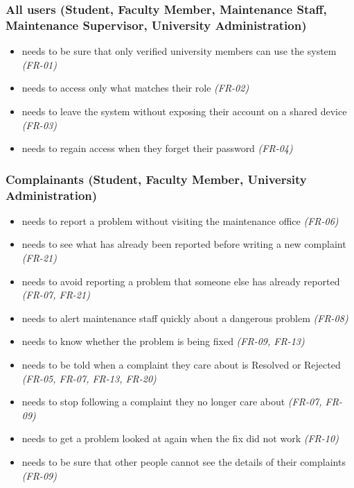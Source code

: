 \subsubsection*{All users (Student, Faculty Member, Maintenance Staff, Maintenance Supervisor, University Administration)}

\begin{itemize}
  \item needs to be sure that only verified university members can use the system \textit{(FR-01)}
  \item needs to access only what matches their role \textit{(FR-02)}
  \item needs to leave the system without exposing their account on a shared device \textit{(FR-03)}
  \item needs to regain access when they forget their password \textit{(FR-04)}
\end{itemize}

\subsubsection*{Complainants (Student, Faculty Member, University Administration)}

\begin{itemize}
  \item needs to report a problem without visiting the maintenance office \textit{(FR-06)}
  \item needs to see what has already been reported before writing a new complaint \textit{(FR-21)}
  \item needs to avoid reporting a problem that someone else has already reported \textit{(FR-07, FR-21)}
  \item needs to alert maintenance staff quickly about a dangerous problem \textit{(FR-08)}
  \item needs to know whether the problem is being fixed \textit{(FR-09, FR-13)}
  \item needs to be told when a complaint they care about is Resolved or Rejected \textit{(FR-05, FR-07, FR-13, FR-20)}
  \item needs to stop following a complaint they no longer care about \textit{(FR-07, FR-09)}
  \item needs to get a problem looked at again when the fix did not work \textit{(FR-10)}
  \item needs to be sure that other people cannot see the details of their complaints \textit{(FR-09)}
\end{itemize}

